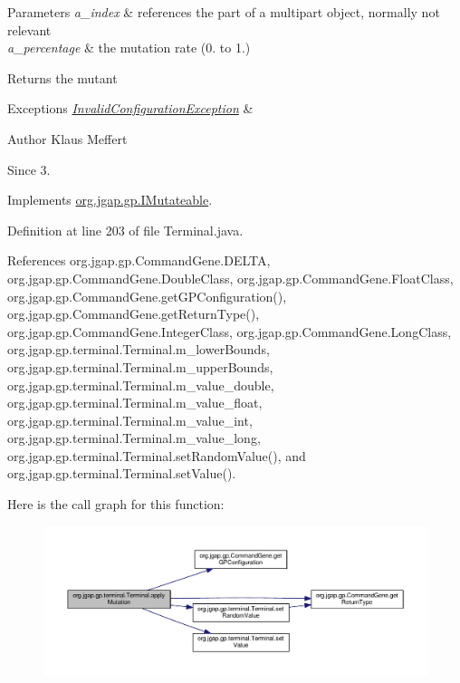 \begin{DoxyParams}{Parameters}
{\em a\-\_\-index} & references the part of a multipart object, normally not relevant \\
\hline
{\em a\-\_\-percentage} & the mutation rate (0. to 1.) \\
\hline
\end{DoxyParams}
\begin{DoxyReturn}{Returns}
the mutant 
\end{DoxyReturn}

\begin{DoxyExceptions}{Exceptions}
{\em \hyperlink{classorg_1_1jgap_1_1_invalid_configuration_exception}{Invalid\-Configuration\-Exception}} & \\
\hline
\end{DoxyExceptions}
\begin{DoxyAuthor}{Author}
Klaus Meffert 
\end{DoxyAuthor}
\begin{DoxySince}{Since}
3. 
\end{DoxySince}


Implements \hyperlink{interfaceorg_1_1jgap_1_1gp_1_1_i_mutateable_abe553182ae983c2092495c889eecb2e2}{org.\-jgap.\-gp.\-I\-Mutateable}.



Definition at line 203 of file Terminal.\-java.



References org.\-jgap.\-gp.\-Command\-Gene.\-D\-E\-L\-T\-A, org.\-jgap.\-gp.\-Command\-Gene.\-Double\-Class, org.\-jgap.\-gp.\-Command\-Gene.\-Float\-Class, org.\-jgap.\-gp.\-Command\-Gene.\-get\-G\-P\-Configuration(), org.\-jgap.\-gp.\-Command\-Gene.\-get\-Return\-Type(), org.\-jgap.\-gp.\-Command\-Gene.\-Integer\-Class, org.\-jgap.\-gp.\-Command\-Gene.\-Long\-Class, org.\-jgap.\-gp.\-terminal.\-Terminal.\-m\-\_\-lower\-Bounds, org.\-jgap.\-gp.\-terminal.\-Terminal.\-m\-\_\-upper\-Bounds, org.\-jgap.\-gp.\-terminal.\-Terminal.\-m\-\_\-value\-\_\-double, org.\-jgap.\-gp.\-terminal.\-Terminal.\-m\-\_\-value\-\_\-float, org.\-jgap.\-gp.\-terminal.\-Terminal.\-m\-\_\-value\-\_\-int, org.\-jgap.\-gp.\-terminal.\-Terminal.\-m\-\_\-value\-\_\-long, org.\-jgap.\-gp.\-terminal.\-Terminal.\-set\-Random\-Value(), and org.\-jgap.\-gp.\-terminal.\-Terminal.\-set\-Value().



Here is the call graph for this function\-:
\nopagebreak
\begin{figure}[H]
\begin{center}
\leavevmode
\includegraphics[width=350pt]{classorg_1_1jgap_1_1gp_1_1terminal_1_1_terminal_aa83c3694e0ae92eee2d50696d693ba23_cgraph}
\end{center}
\end{figure}


